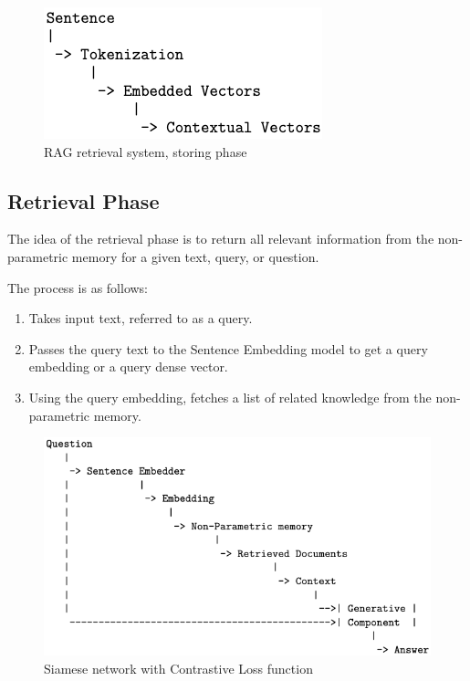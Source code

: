 \documentclass{wseas}
\begin{document}
\begin{figure}[htbp]
  \centering
  \includegraphics[width=\linewidth]{resources/v1/retrievalSystemStoringPhase.png}
  \caption{RAG retrieval system, storing phase}
  \label{fig:retrieval_system_storing_phase_figure}
\end{figure}

\subsection{Retrieval Phase}

The idea of the retrieval phase is to return all relevant information
from the non-parametric memory for a given text, query, or question.

The process is as follows:

\begin{enumerate}
\def\labelenumi{\arabic{enumi}.}
\item
  Takes input text, referred to as a query.
\item
  Passes the query text to the Sentence Embedding model to get a query
  embedding or a query dense vector.
\item
  Using the query embedding, fetches a list of related knowledge from
  the non-parametric memory.
\end{enumerate}


\begin{figure}[htbp]
  \centering
  \includegraphics[width=\linewidth]{resources/v1/retrievalSystemRetreavalPhase.png} %
  \caption{Siamese network with Contrastive Loss function}
  \label{fig:retrieval_system_retreaval_phase_figure}
\end{figure}
\end{document}
